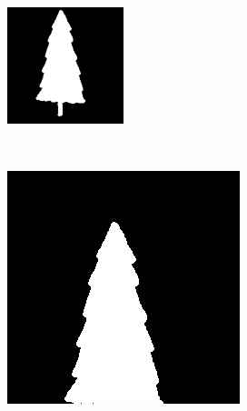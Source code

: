 \documentclass[
	article,			%
	11pt,				%
	oneside,			%
	a4paper,			%
	english,			%
	brazil,				%
	sumario=tradicional
	]{abntex2}
\begin{document}
\begin{figure}
		\centering
        \begin{subfigure}[b]{0.3\textwidth}
                \includegraphics[width=\textwidth]{imagens/ex1/imageScale1.png}
                \caption{}
                \label{fig:TransOriginal}
        \end{subfigure}%
        ~ %
        \begin{subfigure}[b]{0.3\textwidth}
                \includegraphics[width=\textwidth]{imagens/ex1/imageT1.png}

\end{subfigure}
\end{figure}
\end{document}
